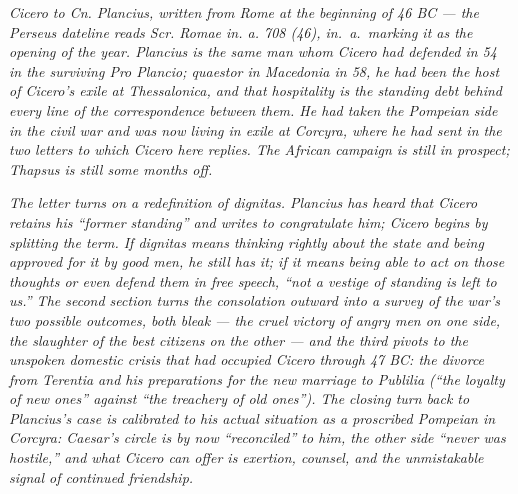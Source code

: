 
\textit{Cicero to Cn. Plancius, written from Rome at the
beginning of 46 BC --- the Perseus dateline reads
\textit{Scr. Romae in. a. 708 (46)}, \textit{in.\ a.}\
marking it as the opening of the year. Plancius is the
same man whom Cicero had defended in 54 in the surviving
\textit{Pro Plancio}; quaestor in Macedonia in 58, he had
been the host of Cicero's exile at Thessalonica, and that
hospitality is the standing debt behind every line of the
correspondence between them. He had taken the Pompeian
side in the civil war and was now living in exile at
Corcyra, where he had sent in the two letters to which
Cicero here replies. The African campaign is still in
prospect; Thapsus is still some months off.}

\textit{The letter turns on a redefinition of \textit{dignitas}.
Plancius has heard that Cicero retains his ``former
standing'' and writes to congratulate him; Cicero begins by
splitting the term. If \textit{dignitas} means thinking
rightly about the state and being approved for it by good
men, he still has it; if it means being able to act on
those thoughts or even defend them in free speech, ``not a
vestige of standing is left to us.'' The second section
turns the consolation outward into a survey of the war's
two possible outcomes, both bleak --- the cruel victory of
angry men on one side, the slaughter of the best citizens
on the other --- and the third pivots to the unspoken
domestic crisis that had occupied Cicero through 47 BC: the
divorce from Terentia and his preparations for the new
marriage to Publilia (``the loyalty of new ones'' against
``the treachery of old ones''). The closing turn back to
Plancius's case is calibrated to his actual situation as a
proscribed Pompeian in Corcyra: Caesar's circle is by now
``reconciled'' to him, the other side ``never was hostile,''
and what Cicero can offer is exertion, counsel, and the
unmistakable signal of continued friendship.}
